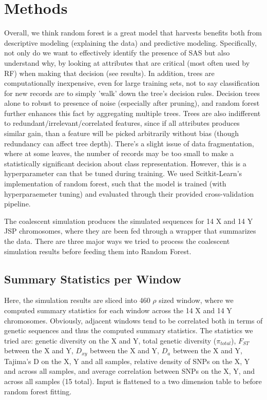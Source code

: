 \documentclass[10pt]{article}
\begin{document}
\section{Methods}

Overall, we think random forest is a great model that harvests benefits both from descriptive modeling (explaining the data) and predictive modeling. Specifically, not only do we want to effectively identify the presence of SAS but also understand why, by looking at attributes that are critical (most often used by RF) when making that decision (see results). In addition, trees are computationally inexpensive, even for large training sets, not to say classification for new records are to simply 'walk' down the tree's decision rules. Decision trees alone to robust to presence of noise (especially after pruning), and random forest further enhances this fact by aggregating multiple trees. Trees are also indifferent to redundant/irrelevant/correlated features, since if all attributes produces similar gain, than a feature will be picked arbitrarily without bias (though redundancy can affect tree depth). There's a slight issue of data fragmentation, where at some leaves, the number of records may be too small to make a statistically significant decision about class representation. However, this is a hyperparameter can that be tuned during training. We used Scitkit-Learn's implementation of random forest, such that the model is trained (with hyperparaemeter tuning) and evaluated through their provided cross-validation pipeline.

The coalescent simulation produces the simulated sequences for 14 X and 14 Y JSP chromosomes, where they are been fed through a wrapper that summarizes the data. There are three major ways we tried to process the coalescent simulation results before feeding them into Random Forest.

\subsection{Summary Statistics per Window}

Here, the simulation results are sliced into 460 $\rho$ sized window, where we computed summary statistics for each window across the 14 X and 14 Y chromosomes. Obviously, adjacent windows tend to be correlated both in terms of genetic sequences and thus the computed summary statistics. The statistics we tried are: genetic diversity on the X and Y, total genetic diversity ($\pi_{total}$), $F_{ST}$ between the X and Y, $D_{xy}$ between the X and Y, $D_{a}$ between the X and Y, Tajima's D on the X, Y and all samples, relative density of SNPs on the X, Y and across all samples, and average correlation between SNPs on the X, Y, and across all samples (15 total). Input is flattened to a two dimension table to before random forest fitting. 
\end{document}
